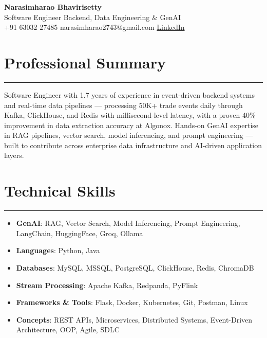 \documentclass[10pt]{article}
\begin{document}
\begin{center}
  {\huge\textbf{Narasimharao Bhavirisetty}}\\[3pt]
  Software Engineer \textbullet{} Backend, Data Engineering \& GenAI \\[3pt]
  +91 63032 27485 \textbullet{} narasimharao2743@gmail.com \textbullet{} \href{https://linkedin.com/in/narasimharao-bhavirisetty-0526891b0}{LinkedIn}
\end{center}

\vspace{4pt}

\section*{Professional Summary}
\vspace{1pt}\hrule\vspace{4pt}
Software Engineer with 1.7 years of experience in event-driven backend systems and real-time data pipelines — processing 50K+ trade events daily through Kafka, ClickHouse, and Redis with millisecond-level latency, with a proven 40\% improvement in data extraction accuracy at Algonox. Hands-on GenAI expertise in RAG pipelines, vector search, model inferencing, and prompt engineering — built to contribute across enterprise data infrastructure and AI-driven application layers.

\section*{Technical Skills}
\vspace{1pt}\hrule\vspace{4pt}
\begin{itemize}
  \item \textbf{GenAI}: RAG, Vector Search, Model Inferencing, Prompt Engineering, LangChain, HuggingFace, Groq, Ollama
  \item \textbf{Languages}: Python, Java
  \item \textbf{Databases}: MySQL, MSSQL, PostgreSQL, ClickHouse, Redis, ChromaDB
  \item \textbf{Stream Processing}: Apache Kafka, Redpanda, PyFlink
  \item \textbf{Frameworks \& Tools}: Flask, Docker, Kubernetes, Git, Postman, Linux
  \item \textbf{Concepts}: REST APIs, Microservices, Distributed Systems, Event-Driven Architecture, OOP, Agile, SDLC
\end{itemize}
\end{document}
